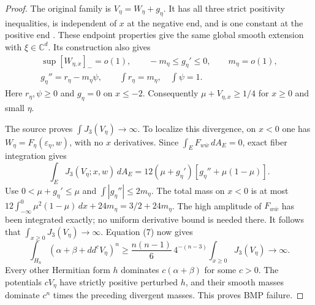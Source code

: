 \documentclass[11pt]{article}
\newcommand{\ddc}{dd^c}
\theoremstyle{remark}\newtheorem{remark}[theorem]{Remark}
\begin{document}
\begin{proof}
The original family is $V_\eta=W_\eta+g_\eta$.
It has all three strict positivity inequalities, is independent
of $x$ at the negative end, and is one constant at the positive end
\cite[Proposition 4.1]{XZ}. These endpoint properties give the
same global smooth extension with $\xi\in\mathbb C^d$.
Its construction also gives
\[
 \begin{gathered}
 \sup[W_{\eta,x}]_-=o(1),\qquad
 -m_\eta\le g_\eta'\le0,\qquad m_\eta=o(1),\\
 g_\eta''=r_\eta-m_\eta\psi,\qquad
 \int r_\eta=m_\eta,\quad\int\psi=1.
 \end{gathered}
\]
Here $r_\eta,\psi\ge0$ and $g_\eta=0$ on $x\le-2$.
Consequently $\mu+V_{\eta,x}\ge1/4$ for $x\ge0$ and small $\eta$.

The source proves $\int J_3(V_\eta)\to\infty$. To localize this
divergence, on $x<0$ one has
$W_\eta=F_\eta(\varepsilon_\eta,w)$, with no $x$ derivatives.
Since $\int_EF_{w\bar w}\,dA_E=0$, exact fiber integration gives
\[
 \int_E J_3(V_\eta;x,w)\,dA_E
   =12(\mu+g_\eta')[g_\eta''+\mu(1-\mu)].
\]
Use $0<\mu+g_\eta'\le\mu$ and
$\int|g_\eta''|\le2m_\eta$. The total mass on $x<0$ is at most
$12\int_{-\infty}^0\mu^2(1-\mu)\,dx+24m_\eta
=3/2+24m_\eta$.
The high amplitude of $F_{w\bar w}$ has been integrated exactly;
no uniform derivative bound is needed there.
It follows that $\int_{x\ge0}J_3(V_\eta)\to\infty$.
Equation (7) now gives
\[
 \int_{H_n}(\alpha+\beta+\ddc V_\eta)^n
 \ge\frac{n(n-1)}6\,4^{-(n-3)}\int_{x\ge0}J_3(V_\eta)
 \longrightarrow\infty.
\]
Every other Hermitian form $h$ dominates $c(\alpha+\beta)$
for some $c>0$. The potentials $cV_\eta$ have strictly positive
perturbed $h$, and their smooth masses dominate $c^n$ times
the preceding divergent masses. This proves BMP failure.
\end{proof}
\end{document}
